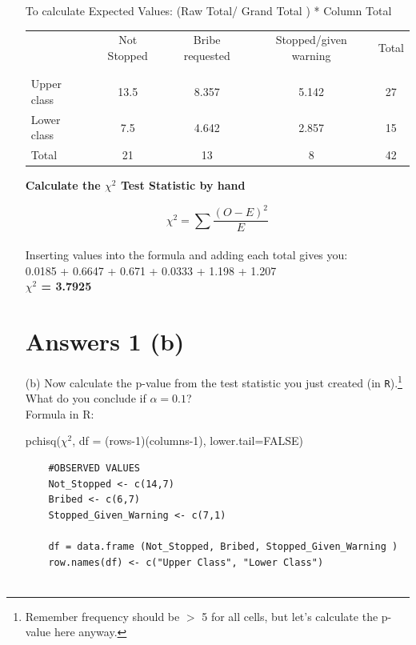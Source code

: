 \documentclass[12pt,letterpaper]{article}
\begin{document}
\begin{enumerate}
To calculate Expected Values: (Raw Total/ Grand Total ) * Column Total \\ 

\begin{table}[h!]
	\centering
	\begin{tabular}{l | c c c c }
		& Not Stopped & Bribe requested & Stopped/given warning & Total \\
		\\[-1.8ex] 
		\hline \\[-1.8ex]
		Upper class & 13.5 & 8.357 & 5.142 & 27 \\
		Lower class & 7.5 & 4.642 & 2.857 & 15 \\
		\hline
		Total & 21 & 13 & 8 & 42 \\
		\hline
	\end{tabular}
\end{table}

\textbf{Calculate the $\chi^2$ Test Statistic by hand}

$$\chi^2 = \sum \frac {(O - E)^2}{E}$$ \\

Inserting values into the formula and adding each total gives you: \\

0.0185 + 0.6647 + 0.671 + 0.0333 + 1.198 + 1.207 \\

\textbf{$\chi^2$ = 3.7925 } \\

\newpage

\section*{Answers 1 (b)}

	\item [(b)]
	Now calculate the p-value from the test statistic you just created (in \texttt{R}).\footnote{Remember frequency should be $>$ 5 for all cells, but let's calculate the p-value here anyway.}  What do you conclude if $\alpha = 0.1$?\\

Formula in R: 

pchisq($\chi^2$, df = (rows-1)(columns-1), lower.tail=FALSE) \\

\begin{verbatim}
	#OBSERVED VALUES
	Not_Stopped <- c(14,7)
	Bribed <- c(6,7)
	Stopped_Given_Warning <- c(7,1)
	
	df = data.frame (Not_Stopped, Bribed, Stopped_Given_Warning )
	row.names(df) <- c("Upper Class", "Lower Class")
	

\end{verbatim}
\end{enumerate}
\end{document}

